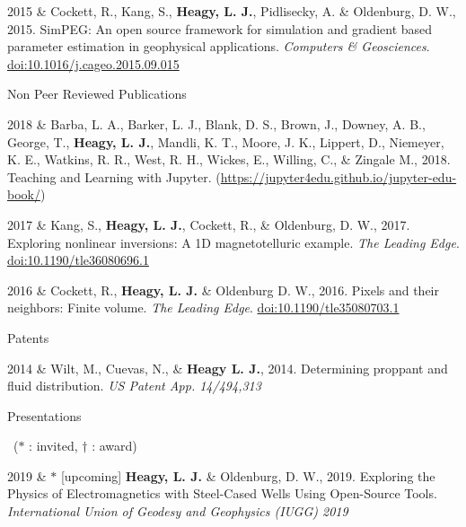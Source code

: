 \documentclass[a4paper, 11pt]{article}
\newcommand{\doi}[1]{\href{https://doi.org/#1}{doi:#1}}
\newcommand{\subheading}[1]{
    \vspace{0.3cm}
    {%
    \Large
    #1}\\
    \vspace{0.0cm}
}
\begin{document}
\begin{entryright}
2015 & Cockett, R., Kang, S., \textbf{Heagy, L. J.}, Pidlisecky, A. \& Oldenburg, D. W., 2015. SimPEG: An open source framework for simulation and gradient based parameter estimation in geophysical applications. \emph{Computers \& Geosciences}. \doi{10.1016/j.cageo.2015.09.015}
\end{entryright}


\subheading{Non Peer Reviewed Publications}

\begin{entryright}
2018 & Barba, L. A., Barker, L. J., Blank, D. S., Brown, J., Downey, A. B., George, T., \textbf{Heagy, L. J.},  Mandli, K. T., Moore, J. K., Lippert, D.,  Niemeyer, K. E., Watkins, R. R., West, R. H., Wickes, E., Willing, C., \& Zingale M., 2018. Teaching and Learning with Jupyter. (\href{https://jupyter4edu.github.io/jupyter-edu-book/}{https://jupyter4edu.github.io/jupyter-edu-book/})
\end{entryright}

\begin{entryright}
2017 & Kang, S., \textbf{Heagy, L. J.}, Cockett, R.,  \& Oldenburg, D. W., 2017. Exploring nonlinear inversions: A 1D magnetotelluric example. \emph{The Leading Edge}. \doi{10.1190/tle36080696.1}
\end{entryright}

\begin{entryright}
2016 & Cockett, R., \textbf{Heagy, L. J.} \& Oldenburg D. W., 2016. Pixels and their neighbors: Finite volume. \emph{The Leading Edge}. \doi{10.1190/tle35080703.1}
\end{entryright}

\subheading{Patents}

\begin{entryright}
2014 & Wilt, M., Cuevas, N., \& \textbf{Heagy L. J.}, 2014. Determining proppant and fluid distribution. \emph{US Patent App. 14/494,313}
\end{entryright}



\subheading{Presentations}

\vspace{-0.3cm}
~($*$ : invited,  $\dagger$ : award)
\vspace{0.2cm}

\begin{entryright}
2019 & $*$ [upcoming] \textbf{Heagy, L. J.} \& Oldenburg, D. W., 2019. Exploring the Physics of Electromagnetics with Steel-Cased Wells Using Open-Source Tools. \emph{International Union of Geodesy and Geophysics (IUGG) 2019}
\end{entryright}
\end{document}
